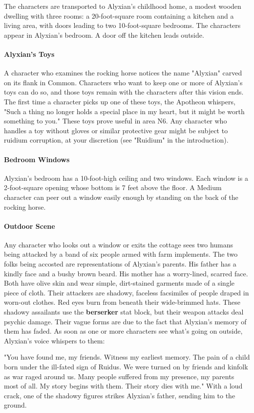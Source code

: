 \documentclass[10pt,a4,twoside,twocolumn,openany,nodeprecatedcode]{dndbook}
\begin{document}
The characters are transported to Alyxian's childhood home, a modest wooden dwelling with three rooms: a 20-foot-square room containing a kitchen and a living area, with doors leading to two 10-foot-square bedrooms. The characters appear in Alyxian's bedroom. A door off the kitchen leads outside.
\paragraph{Alyxian's Toys}
A character who examines the rocking horse notices the name "Alyxian" carved on its flank in Common. Characters who want to keep one or more of Alyxian's toys can do so, and those toys remain with the characters after this vision ends. The first time a character picks up one of these toys, the Apotheon whispers, "Such a thing no longer holds a special place in my heart, but it might be worth something to you." These toys prove useful in area N6. Any character who handles a toy without gloves or similar protective gear might be subject to ruidium corruption, at your discretion (see "Ruidium" in the introduction).
\paragraph{Bedroom Windows}
Alyxian's bedroom has a 10-foot-high ceiling and two windows. Each window is a 2-foot-square opening whose bottom is 7 feet above the floor. A Medium character can peer out a window easily enough by standing on the back of the rocking horse.
\paragraph{Outdoor Scene}
Any character who looks out a window or exits the cottage sees two humans being attacked by a band of six people armed with farm implements. The two folks being accosted are representations of Alyxian's parents. His father has a kindly face and a bushy brown beard. His mother has a worry-lined, scarred face. Both have olive skin and wear simple, dirt-stained garments made of a single piece of cloth. Their attackers are shadowy, faceless facsimiles of people draped in worn-out clothes. Red eyes burn from beneath their wide-brimmed hats. These shadowy assailants use the \textbf{berserker} stat block, but their weapon attacks deal psychic damage. Their vague forms are due to the fact that Alyxian's memory of them has faded.
As soon as one or more characters see what's going on outside, Alyxian's voice whispers to them:
\begin{DndReadAloud}{}
"You have found me, my friends. Witness my earliest memory. The pain of a child born under the ill-fated sign of Ruidus. We were turned on by friends and kinfolk as war raged around us. Many people suffered from my presence, my parents most of all. My story begins with them. Their story dies with me."
With a loud crack, one of the shadowy figures strikes Alyxian's father, sending him to the ground.
\end{DndReadAloud}
\end{document}
